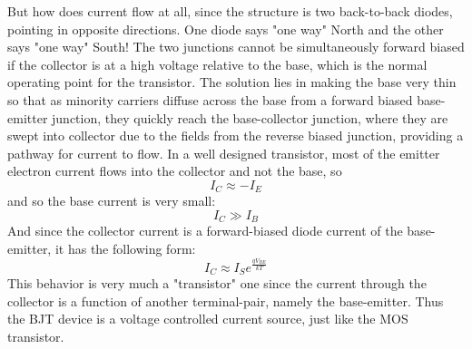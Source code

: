 But how does current flow at all, since the structure is two back-to-back diodes, pointing in opposite directions.  One diode says "one way" North and the other says "one way" South!  The two junctions cannot be simultaneously forward biased if the collector is at a high voltage relative to the base, which is the normal operating point for the transistor.  The solution lies in making the base very thin so that as minority carriers diffuse across the base from a forward biased base-emitter junction, they quickly reach the base-collector junction, where they are swept into collector due to the fields from the reverse biased junction, providing a pathway for current to flow.  
In a well designed transistor, most of the emitter electron current flows into the collector and not the base, so 
    \begin{equation}
        {I_C} \approx  - {I_E}
    \end{equation}
and so the base current is very small:
    \begin{equation}
        {I_C} \gg {I_B}
    \end{equation}
And since the collector current is a forward-biased diode current of the base-emitter, it has the following form:
    \begin{equation}
        {I_C} \approx {I_S}{e^{\frac{{q{V_{BE}}}}{{kT}}}}
    \end{equation}
This behavior is very much a "transistor" one since the current through the collector is a function of another terminal-pair, namely the base-emitter.  Thus the BJT device is a voltage controlled current source, just like the MOS transistor.
